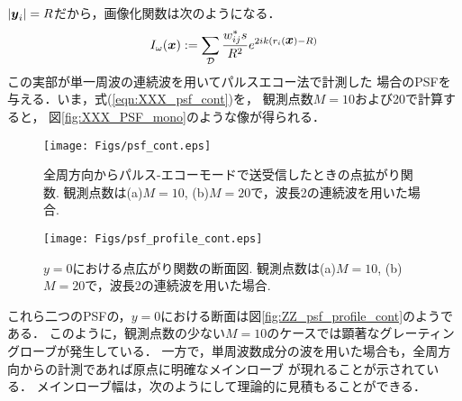 $|\mbox{\boldmath $y$}_i|=R$だから，画像化関数は次のようになる．
\begin{equation}
	I_\omega(\mbox{\boldmath $x$})
		:=
	\sum_{\cal D} 
	\frac{w_{ij}^*s}{R^2}
	e^{
	2ik
	\left(
		r_i(\mbox{\boldmath $x$})-R
	\right)
	}
	\label{eqn:XXX_PSF_cont}
\end{equation}
この実部が単一周波の連続波を用いてパルスエコー法で計測した
場合のPSFを与える．いま，式(\ref{eqn:XXX_psf_cont})を，
観測点数$M=10$および20で計算すると，
図\ref{fig:XXX_PSF_mono}のような像が得られる．
\begin{figure}[h]
	\begin{center}
	\texttt{[image: Figs/psf\_cont.eps]} 
	\end{center}
	\caption{
	全周方向からパルス-エコーモードで送受信したときの点拡がり関数.
	観測点数は(a)$M=10$, (b)$M=20$で，波長2の連続波を用いた場合.} 
	\label{fig:XXX_psf_cont}
\end{figure}
\begin{figure}[h]
	\begin{center}
	\texttt{[image: Figs/psf\_profile\_cont.eps]} 
	\end{center}
	\caption{$y=0$における点広がり関数の断面図. 
	観測点数は(a)$M=10$, (b)$M=20$で，波長2の連続波を用いた場合.}
	\label{fig:XXX_psf_profile_cont}
\end{figure}
これら二つのPSFの，$y=0$における断面は図\ref{fig:ZZ_psf_profile_cont}のようである．
このように，観測点数の少ない$M=10$のケースでは顕著なグレーティングローブが発生している．
一方で，単周波数成分の波を用いた場合も，全周方向からの計測であれば原点に明確なメインローブ
が現れることが示されている．
メインローブ幅は，次のようにして理論的に見積もることができる．


